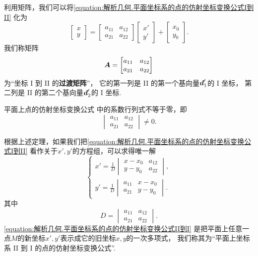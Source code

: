 利用矩阵，我们可以将\cref{equation:解析几何.平面坐标系的点的仿射坐标变换公式I到II}
化为\begin{equation}\label{equation:解析几何.平面坐标系的点的仿射坐标变换公式I到II.矩阵形式1}
	\begin{bmatrix}
		x \\ y
	\end{bmatrix}
	= \begin{bmatrix}
		a_{11} & a_{12} \\
		a_{21} & a_{22}
	\end{bmatrix} \begin{bmatrix}
		x' \\ y'
	\end{bmatrix} + \begin{bmatrix}
		x_0 \\ y_0
	\end{bmatrix}.
\end{equation}
我们称矩阵\[
	\boldsymbol{A} = \begin{bmatrix}
		a_{11} & a_{12} \\
		a_{21} & a_{22}
	\end{bmatrix}
\]为“坐标 I 到 II 的\textbf{过渡矩阵}”，
它的第一列是 II 的第一个基向量\(\boldsymbol{d}_1'\)的 I 坐标，
第二列是 II 的第二个基向量\(\boldsymbol{d}_2'\)的 I 坐标.

\begin{theorem}
平面上点的仿射坐标变换公式 
中的系数行列式不等于零，即\[
	\begin{vmatrix}
		a_{11} & a_{12} \\
		a_{21} & a_{22}
	\end{vmatrix} \neq 0.
\]
\end{theorem}

根据上述定理，如果我们把\cref{equation:解析几何.平面坐标系的点的仿射坐标变换公式I到II}
看作关于\(x',y'\)的方程组，可以求得唯一解
\begin{equation}\label{equation:解析几何.平面坐标系的点的仿射坐标变换公式II到I}
	\left\{ \begin{array}{l}
		x' = \frac{1}{D} \begin{vmatrix}
			x - x_0 & a_{12} \\
			y - y_0 & a_{22}
		\end{vmatrix}, \\
		y' = \frac{1}{D} \begin{vmatrix}
			a_{11} & x - x_0 \\
			a_{21} & y - y_0
		\end{vmatrix}.
	\end{array} \right.
\end{equation}
其中\[
	D = \begin{vmatrix}
		a_{11} & a_{12} \\
		a_{21} & a_{22}
	\end{vmatrix}.
\]
\cref{equation:解析几何.平面坐标系的点的仿射坐标变换公式II到I}
是把平面上任意一点\(M\)的新坐标\(x',y'\)表示成它的旧坐标\(x,y\)的一次多项式，
我们称其为“平面上坐标系 II 到 I 的点的仿射坐标变换公式”.

